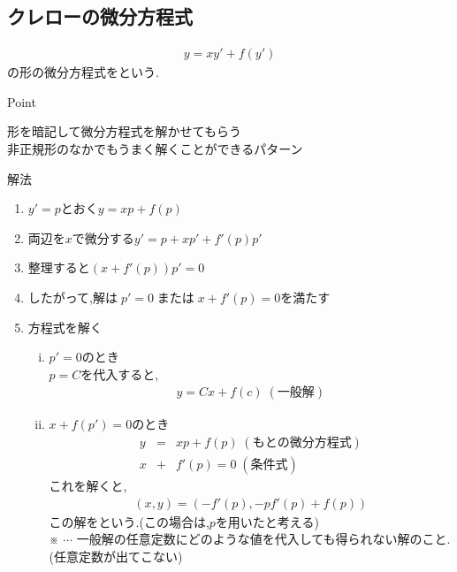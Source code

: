 \documentclass[a4paper]{jsarticle}
\begin{document}
\subsection{クレローの微分方程式}
\begin{eqnarray*}
    y=xy'+f\left(y'\right)
\end{eqnarray*}
の形の微分方程式をという.\\
\begin{itembox}[l]{Point}
    \begin{center}
        形を暗記して微分方程式を解かせてもらう\\
        非正規形のなかでもうまく解くことができるパターン
    \end{center}
\end{itembox}
\begin{itembox}[l]{解法}
    \begin{enumerate}[(1)]
        \item$y'=p$とおく\quad$y=xp+f\left(p\right)$
        \item 両辺を$x$で微分する\quad$y'=p+xp'+f'\left(p\right)p'$
        \item 整理すると\quad$\left(x+f'\left(p\right)\right)p'=0$
        \item したがって,解は$\;p'=0\;$または$\; x+f'\left(p\right)=0$を満たす
        \item 方程式を解く
              \begin{enumerate}[(i)]
                  \item $p'=0$のとき\\
                        $p=C$を代入すると,
                        \begin{eqnarray*}
                            y=Cx+f\left(c\right)\;(一般解)
                        \end{eqnarray*}
                  \item $x+f\left(p'\right)=0$のとき
                        \begin{eqnarray*}
                            y&=&xp+f\left(p\right)\; (もとの微分方程式)\\
                            x&+&f'\left(p\right)=0\; (条件式)
                        \end{eqnarray*}
                        これを解くと,
                        \begin{eqnarray*}
                            \left(x,y\right)=\left(-f'\left(p\right),-pf'\left(p\right)+f\left(p\right)\right)
                        \end{eqnarray*}
                        この解をという.(この場合は,$p$を用いたと考える)\\
                        ※ $\cdots$ 一般解の任意定数にどのような値を代入しても得られない解のこと.\\
                        \quad(任意定数が出てこない)
              \end{enumerate}
    \end{enumerate}
\end{itembox}
\end{document}
